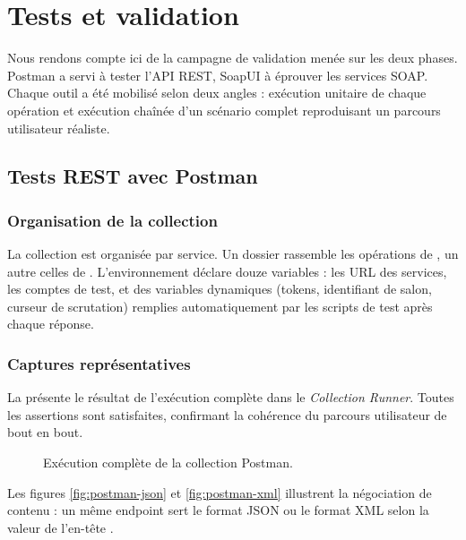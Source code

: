 \section{Tests et validation}

Nous rendons compte ici de la campagne de validation menée sur les deux phases. Postman a servi à tester l'API REST, SoapUI à éprouver les services SOAP. Chaque outil a été mobilisé selon deux angles : exécution unitaire de chaque opération et exécution chaînée d'un scénario complet reproduisant un parcours utilisateur réaliste.

\subsection{Tests REST avec Postman}

\subsubsection{Organisation de la collection}

La collection  est organisée par service. Un dossier rassemble les opérations de , un autre celles de . L'environnement  déclare douze variables : les URL des services, les comptes de test, et des variables dynamiques (tokens, identifiant de salon, curseur de scrutation) remplies automatiquement par les scripts de test après chaque réponse.

\subsubsection{Captures représentatives}

La  présente le résultat de l'exécution complète dans le \emph{Collection Runner}. Toutes les assertions sont satisfaites, confirmant la cohérence du parcours utilisateur de bout en bout.

\begin{figure}[H]
  \centering
  \fbox{\rule{0pt}{7cm}\rule{12cm}{0pt}}
  \caption{Exécution complète de la collection Postman.}
  \label{fig:postman-runner}
\end{figure}

Les figures \autoref{fig:postman-json} et \autoref{fig:postman-xml} illustrent la négociation de contenu : un même endpoint sert le format JSON ou le format XML selon la valeur de l'en-tête .

